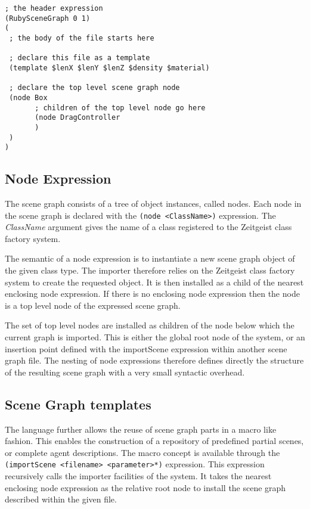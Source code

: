 \begin{lstlisting}[caption={File Structure},label=rsg:structure]
; the header expression
(RubySceneGraph 0 1)
(
 ; the body of the file starts here

 ; declare this file as a template
 (template $lenX $lenY $lenZ $density $material)

 ; declare the top level scene graph node
 (node Box
       ; children of the top level node go here
       (node DragController
       )
 )
)
\end{lstlisting}

\subsection{Node Expression}

The scene graph consists of a tree of object instances, called nodes.
Each node in the scene graph is declared with the \texttt{(node
  <ClassName>)} expression. The \emph{ClassName} argument gives the
name of a class registered to the Zeitgeist class factory system. 

The semantic of a node expression is to instantiate a new scene graph
object of the given class type. The importer therefore relies on the
Zeitgeist class factory system to create the requested object. It is
then installed as a child of the nearest enclosing node expression. If
there is no enclosing node expression then the node is a top level
node of the expressed scene graph.

The set of top level nodes are installed as children of the node below
which the current graph is imported. This is either the global root
node of the system, or an insertion point defined with the importScene
expression within another scene graph file. The nesting of node
expressions therefore defines directly the structure of the resulting
scene graph with a very small syntactic overhead.

\subsection{Scene Graph templates}
\label{subsec:template}
The language further allows the reuse of scene graph parts in a macro
like fashion. This enables the construction of a repository of
predefined partial scenes, or complete agent descriptions. The macro
concept is available through the \texttt{(importScene <filename>
  <parameter>*)} expression. This expression recursively calls the
importer facilities of the system. It takes the nearest enclosing node
expression as the relative root node to install the scene graph
described within the given file.

